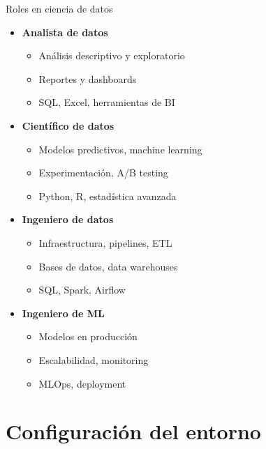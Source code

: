 \documentclass{beamer}
\begin{document}
\begin{frame}{Roles en ciencia de datos}
\begin{itemize}
    \item \textbf{Analista de datos}
    \begin{itemize}
        \item Análisis descriptivo y exploratorio
        \item Reportes y dashboards
        \item SQL, Excel, herramientas de BI
    \end{itemize}
    
    \item \textbf{Científico de datos}
    \begin{itemize}
        \item Modelos predictivos, machine learning
        \item Experimentación, A/B testing
        \item Python, R, estadística avanzada
    \end{itemize}
    
    \item \textbf{Ingeniero de datos}
    \begin{itemize}
        \item Infraestructura, pipelines, ETL
        \item Bases de datos, data warehouses
        \item SQL, Spark, Airflow
    \end{itemize}
    
    \item \textbf{Ingeniero de ML}
    \begin{itemize}
        \item Modelos en producción
        \item Escalabilidad, monitoring
        \item MLOps, deployment
    \end{itemize}
\end{itemize}
\end{frame}

\section{Configuración del entorno}
\end{document}

